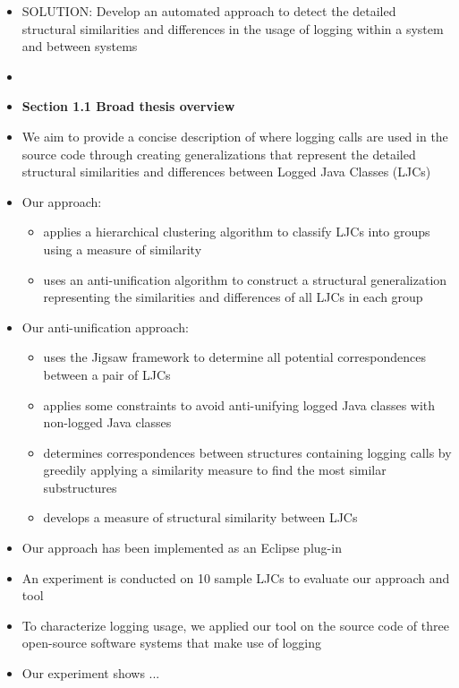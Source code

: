 \documentclass{article}
\newcommand{\bold}{\textbf}
\newcommand{\tsc}{\textsc}
\begin{document}
\begin{itemize} [leftmargin=.1in]
where developers log in practice, in a detailed way
\item \tsc{SOLUTION: }Develop an automated approach to detect the detailed structural similarities and differences in the usage of logging within a system and between systems
\item {}  

\item \bold{Section 1.1 Broad thesis overview}
\item We aim to provide a concise description of where logging calls are used in the source code through creating generalizations that represent the detailed structural similarities and differences between Logged Java Classes (LJCs)

\item{Our approach:}
\begin{itemize}
\item applies a hierarchical clustering algorithm to classify LJCs into groups using a measure of similarity
\item uses an anti-unification algorithm to construct a structural generalization representing the similarities and differences of all LJCs in each group
\end{itemize}

\item{Our anti-unification approach:}
\begin{itemize}
\item uses the Jigsaw framework to determine all potential correspondences between a pair of LJCs
\item applies some constraints to avoid anti-unifying logged Java classes with non-logged Java classes
\item determines correspondences between structures containing logging calls by greedily applying a similarity measure to find the most similar substructures
\item develops a measure of structural similarity between LJCs
\end{itemize}
\item Our approach has been implemented as an Eclipse plug-in
\item An experiment is conducted on 10 sample LJCs to evaluate our approach and tool
\item To characterize logging usage, we applied our tool on the source code of three open-source software systems that make use of logging
\item Our experiment shows ...


\end{itemize}
\end{document}
